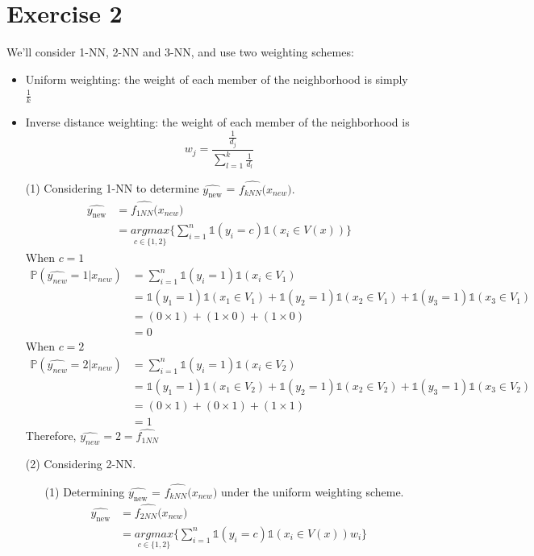 \documentclass[12pt,a4paper]{article}
\begin{document}
\section*{Exercise 2} We’ll
consider 1-NN, 2-NN and 3-NN,  and use two weighting schemes:
\begin{itemize}
	\item Uniform weighting: the weight of each member of the neighborhood is simply $\frac{1}{k}$
	\item  Inverse distance weighting: the weight of each member of the neighborhood is
	\begin{equation}
			w_j  =  \frac{  \frac{1}{d_j}  }  {  \sum_{l = 1}^{k}    \frac{1}  {d_l}  }
			\label{eq:1}
	\end{equation}
\end{itemize}
\begin{enumerate}
	\item[(1)] Considering 1-NN to  determine $\widehat{y_{\text{new}}}$ = $\widehat{f_{kNN}(}x_{new}).$ 
\begin{align*}
		\widehat{y_{\text{new}}} &=  \widehat{f_{1NN}(}x_{new})\\		
		&= \underset{c \in \{1,2\}} {argmax}  \{  \sum_{i = 1}^n  \mathbb{1}(y_i  = c)   \mathbb{1}(x_i \in V(x))   \}
\end{align*}	
When $c = 1$
\begin{align*}
		\mathbb{P}(\widehat{y_{new}}  = 1 | x_{new}) &= \sum_{i = 1}^n  \mathbb{1}(y_i  = 1)   \mathbb{1}(x_i \in V_1)  \\
		&=   \mathbb{1}(y_1 = 1)   \mathbb{1}(x_1 \in V_1)  + \mathbb{1}(y_2 = 1)   \mathbb{1}(x_2 \in V_1)  +\mathbb{1}(y_3= 1)   \mathbb{1}(x_3 \in V_1) \\
		&= (0 \times 1) + ( 1 \times 0) + (1 \times 0)\\
		&= 0
\end{align*}
When $c = 2$
\begin{align*}
		\mathbb{P}(\widehat{y_{new}}  = 2 | x_{new}) &= \sum_{i = 1}^n  \mathbb{1}(y_i  = 1)   \mathbb{1}(x_i \in V_2)  \\
		&=   \mathbb{1}(y_1 = 1)   \mathbb{1}(x_1 \in V_2)  + \mathbb{1}(y_2 = 1)   \mathbb{1}(x_2 \in V_2)  +\mathbb{1}(y_3= 1)   \mathbb{1}(x_3 \in V_2) \\
		&= (0 \times 1) + ( 0 \times 1) + (1 \times 1)\\
		&= 1
\end{align*}
Therefore, $ \widehat{y_{new}} = 2 =  \widehat{f_{1NN}} $
\item[(2)] Considering 2-NN.
	\begin{enumerate}
			\item[(1)]Determining  $\widehat{y_{\text{new}}}$ = $\widehat{f_{kNN}(}x_{new})$  under the uniform weighting scheme.
			\begin{align*}
		\widehat{y_{\text{new}}} &=  \widehat{f_{2NN}(}x_{new})\\		
		&= \underset{c \in \{1,2\}} {argmax}  \{  \sum_{i = 1}^n  \mathbb{1}(y_i  = c)   \mathbb{1}(x_i \in V(x)) w_i   \}
\end{align*}	


\end{enumerate}
\end{enumerate}
\end{document}

